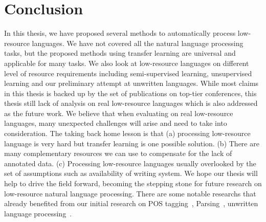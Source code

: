 \documentclass[12pt,twoside,final,hidelinks]{ltthesis}
\theoremstyle{definition}
\begin{document}
\section{Conclusion}
In this thesis, we have proposed several methods to automatically process low-resource languages. We have not covered all the natural language 
processing tasks, but the proposed methods using transfer learning are universal and applicable for many tasks. We also look at low-resource
languages on different level of resource requirements including semi-supervised learning, unsupervised learning and our preliminary attempt at unwritten languages. 
While most claims in this thesis is backed up by the set of publications on top-tier conferences, this thesis still lack of analysis on real low-resource 
languages which is also addressed as the future work. We believe that when evaluating on real low-resource languages, many unexpected challenges will arise and need to take into consideration. 
The taking back home lesson is that (a) processing low-resource language is very hard but transfer learning is one possible solution. (b) There are many complementary resources we can use to compensate for the lack of annotated data. (c) Processing low-resource languages usually overlooked by the set of assumptions such as availability of writing system.  
We hope our thesis will help to drive the field forward, becoming the stepping stone for future research on low-resource natural language processing. There are some
notable researchs that already benefited from our initial research on POS tagging~\cite{DBLP:conf/conll/FangC16,Pecheux2016,zhang-EtAl:2016:N16-13,bacskaya2016semi}, Parsing~\cite{DBLP:journals/corr/GillickBVS15,Guo:2016:RLF:3016100.3016284,TACL892,DBLP:journals/corr/GuoCWL16,ledbetter-dickinson:2016:BEA11,TACL917}, unwritten language processing~\cite{DBLP:journals/corr/BansalKGL16,adams-EtAl:2016:EMNLP2016,anastasopoulos-chiang-duong:2016:EMNLP2016,Wilkinson+2016}. 

\end{document}
